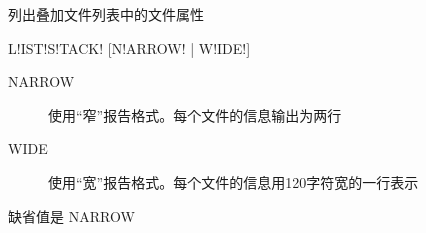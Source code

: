 \label{sss:liststack}

列出叠加文件列表中的文件属性

\begin{SACSTX}
L!IST!S!TACK! [N!ARROW! | W!IDE!]
\end{SACSTX}

\begin{description}
\item [NARROW] 使用``窄''报告格式。每个文件的信息输出为两行
\item [WIDE] 使用``宽''报告格式。每个文件的信息用120字符宽的一行表示
\end{description}

缺省值是 NARROW
